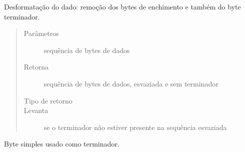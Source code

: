 \documentclass[letterpaper,10pt,brazil]{sphinxmanual}
\begin{document}
\begin{fulllineitems}
\begin{fulllineitems}
\label{\detokenize{estrutarq.dado:estrutarq.dado.DadoTerminador.remova_formatacao}}
\pysigstartsignatures
{}
\pysigstopsignatures
\sphinxAtStartPar
Desformatação do dado: remoção dos bytes de enchimento e também do
byte terminador.
\begin{quote}\begin{description}
\item[{Parâmetros}] \leavevmode
\sphinxAtStartPar
{} \textendash{} sequência de bytes de dados

\item[{Retorna}] \leavevmode
\sphinxAtStartPar
sequência de bytes de dados, esvaziada e sem terminador

\item[{Tipo de retorno}] \leavevmode
\sphinxAtStartPar
{}

\item[{Levanta}] \leavevmode
\sphinxAtStartPar
{} \textendash{} se o terminador não estiver presente na sequência
esvaziada

\end{description}\end{quote}

\end{fulllineitems}


\begin{fulllineitems}
\label{\detokenize{estrutarq.dado:estrutarq.dado.DadoTerminador.terminador}}
\pysigstartsignatures
{}
\pysigstopsignatures
\sphinxAtStartPar
Byte simples usado como terminador.

\end{fulllineitems}


\end{fulllineitems}
\end{document}
